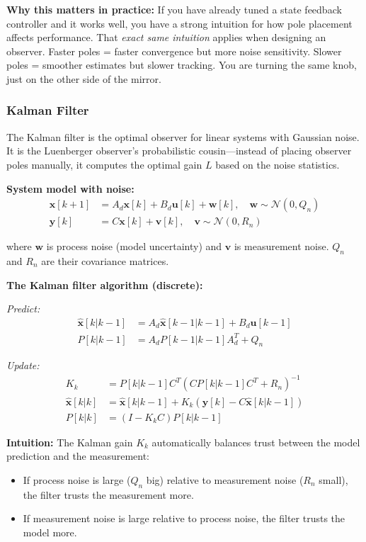 \textbf{Why this matters in practice:} If you have already tuned a state feedback controller and it works well, you have a strong intuition for how pole placement affects performance. That \textit{exact same intuition} applies when designing an observer. Faster poles = faster convergence but more noise sensitivity. Slower poles = smoother estimates but slower tracking. You are turning the same knob, just on the other side of the mirror.

\subsubsection{Kalman Filter}

The Kalman filter is the optimal observer for linear systems with Gaussian noise. It is the Luenberger observer's probabilistic cousin---instead of placing observer poles manually, it computes the optimal gain $L$ based on the noise statistics.

\textbf{System model with noise:}
\begin{align}
\mathbf{x}[k+1] &= A_d \mathbf{x}[k] + B_d \mathbf{u}[k] + \mathbf{w}[k], \quad \mathbf{w} \sim \mathcal{N}(0, Q_n) \\
\mathbf{y}[k] &= C \mathbf{x}[k] + \mathbf{v}[k], \quad \mathbf{v} \sim \mathcal{N}(0, R_n)
\end{align}

where $\mathbf{w}$ is process noise (model uncertainty) and $\mathbf{v}$ is measurement noise. $Q_n$ and $R_n$ are their covariance matrices.

\textbf{The Kalman filter algorithm (discrete):}

\textit{Predict:}
\begin{align}
\hat{\mathbf{x}}[k|k-1] &= A_d \hat{\mathbf{x}}[k-1|k-1] + B_d \mathbf{u}[k-1] \\
P[k|k-1] &= A_d P[k-1|k-1] A_d^T + Q_n
\end{align}

\textit{Update:}
\begin{align}
K_k &= P[k|k-1] C^T (C P[k|k-1] C^T + R_n)^{-1} \\
\hat{\mathbf{x}}[k|k] &= \hat{\mathbf{x}}[k|k-1] + K_k (\mathbf{y}[k] - C \hat{\mathbf{x}}[k|k-1]) \\
P[k|k] &= (I - K_k C) P[k|k-1]
\end{align}

\textbf{Intuition:} The Kalman gain $K_k$ automatically balances trust between the model prediction and the measurement:
\begin{itemize}
    \item If process noise is large ($Q_n$ big) relative to measurement noise ($R_n$ small), the filter trusts the measurement more.
    \item If measurement noise is large relative to process noise, the filter trusts the model more.
\end{itemize}

